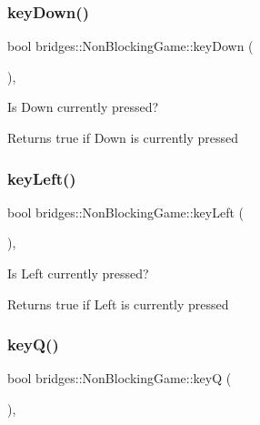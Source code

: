 \subsubsection{\texorpdfstring{key\+Down()}{keyDown()}}
{\footnotesize\ttfamily bool bridges\+::\+Non\+Blocking\+Game\+::key\+Down (\begin{DoxyParamCaption}{ }\end{DoxyParamCaption})\hspace{0.3cm}{\ttfamily [inline]}, {\ttfamily [protected]}}



Is Down currently pressed? 

\begin{DoxyReturn}{Returns}
true if Down is currently pressed 
\end{DoxyReturn}
\mbox{\label{classbridges_1_1_non_blocking_game_a33993f8ba1447230f6d6a98972aa05ee}} 
\subsubsection{\texorpdfstring{key\+Left()}{keyLeft()}}
{\footnotesize\ttfamily bool bridges\+::\+Non\+Blocking\+Game\+::key\+Left (\begin{DoxyParamCaption}{ }\end{DoxyParamCaption})\hspace{0.3cm}{\ttfamily [inline]}, {\ttfamily [protected]}}



Is Left currently pressed? 

\begin{DoxyReturn}{Returns}
true if Left is currently pressed 
\end{DoxyReturn}
\mbox{\label{classbridges_1_1_non_blocking_game_a57943be21a533b82cf3ad4032b811f2a}} 
\subsubsection{\texorpdfstring{key\+Q()}{keyQ()}}
{\footnotesize\ttfamily bool bridges\+::\+Non\+Blocking\+Game\+::keyQ (\begin{DoxyParamCaption}{ }\end{DoxyParamCaption})\hspace{0.3cm}{\ttfamily [inline]}, {\ttfamily [protected]}}



